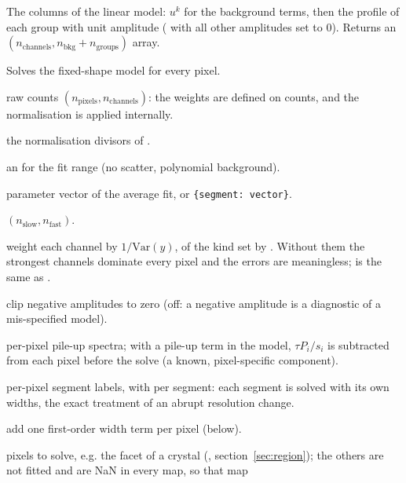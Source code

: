 The columns of the linear model: $u^k$ for the background terms, then the profile of each
group with unit amplitude ( with all other amplitudes set to 0). Returns an
$(n_\mathrm{channels}, n_\mathrm{bkg}+n_\mathrm{groups})$ array.

Solves the fixed-shape model for every pixel.
\begin{args}
\item[raw\_spectra] raw counts $(n_\mathrm{pixels}, n_\mathrm{channels})$: the weights are
  defined on counts, and the normalisation is applied internally.
\item[scale] the normalisation divisors of .
\item[model] an  for the fit range (no scatter, polynomial background).
\item[shape\_params] parameter vector of the average fit, or \texttt{\{segment: vector\}}.
\item[map\_shape] $(n_\mathrm{slow}, n_\mathrm{fast})$.
\item[poisson\_weights] weight each channel by $1/\mathrm{Var}(y)$, of the kind set by
  . Without them the strongest channels dominate every pixel and the errors are
  meaningless;  is the same as .
\item[clip\_negative] clip negative amplitudes to zero (off: a negative amplitude is a
  diagnostic of a mis-specified model).
\item[pileup] per-pixel pile-up spectra; with a pile-up term in the model,
  $\tau P_i/s_i$ is subtracted from each pixel before the solve (a known, pixel-specific
  component).
\item[segments] per-pixel segment labels, with  per segment: each segment
  is solved with its own widths, the exact treatment of an abrupt resolution change.
\item[width\_correction] add one first-order width term per pixel (below).
\item[mask] pixels to solve, e.g. the facet of a crystal (,
  section~\ref{sec:region}); the others are not fitted and are NaN in every map, so that map

\end{args}
